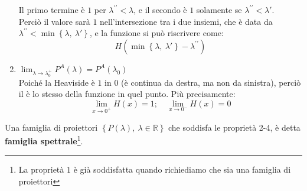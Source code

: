 \documentclass[../../FisicaTeorica.tex]{subfiles}
\begin{document}
\begin{enumerate}
\[	\]
	Il primo termine è $1$ per $\lambda^{\prime\prime}<\lambda$, e il secondo è $1$ solamente se $\lambda^{\prime\prime}<\lambda'$.\\
	Perciò il valore sarà $1$ nell'intersezione tra i due insiemi, che è data da $\lambda^{\prime\prime}<\min{\left\{\lambda,\ \lambda'\right\}}$, e la funzione si può riscrivere come:
	\[
	H\left(\min{\left\{\lambda,\ \lambda '\right\}}-\lambda^{\prime\prime}\right)
	\]
	\item $\displaystyle \lim_{\lambda\rightarrow\lambda_0^+}{P^A\left(\lambda\right)}=P^A(\lambda_0) $\\
	Poiché la Heaviside è $1$ in $0$ (è continua da destra, ma non da sinistra), perciò il  è lo stesso della funzione in quel punto. Più precisamente:
	\[
	\lim_{x\rightarrow 0^+}{H \left(x\right)}=1; \quad 
	\lim_{x\rightarrow 0^-}{H\left(x\right)}=0
	\]
\end{enumerate}
\begin{dfn}
Una famiglia di proiettori $\left\{P\left(\lambda\right),\ \lambda\in\mathbb{R}\right\}$ che soddisfa le proprietà 2-4, è detta \textbf{famiglia spettrale}\footnote{La proprietà $1$ è già soddisfatta quando richiediamo che sia una famiglia di proiettori}.
\end{dfn}
\end{document}
